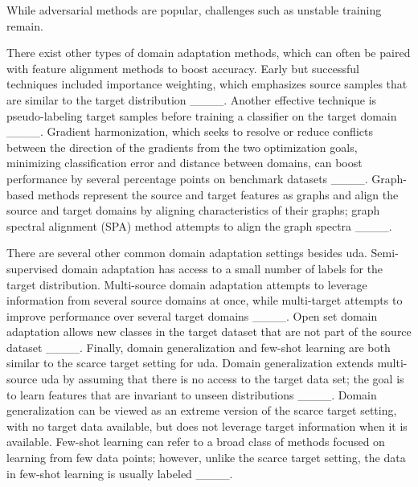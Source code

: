 While adversarial methods are popular, challenges such as unstable training remain.

There exist other types of domain adaptation methods, which can often be paired with feature alignment methods to boost accuracy.
Early but successful techniques included importance weighting, which emphasizes source samples that are similar to the target distribution ____. %
Another effective technique is pseudo-labeling target samples before training a classifier on the target domain ____.
Gradient harmonization, which seeks to resolve or reduce conflicts between the direction of the gradients from the two optimization goals, minimizing classification error and distance between domains, can boost performance by several percentage points on benchmark datasets ____.
Graph-based methods represent the source and target features as graphs and align the source and target domains by aligning characteristics of their graphs; graph spectral alignment (SPA) method attempts to align the graph spectra ____.

There are several other common domain adaptation settings besides \ac{uda}.
Semi-supervised domain adaptation has access to a small number of labels for the target distribution.
Multi-source domain adaptation attempts to leverage information from several source domains at once, while multi-target attempts to improve performance over several target domains ____.
Open set domain adaptation allows new classes in the target dataset that are not part of the source dataset ____.
Finally, domain generalization and few-shot learning are both similar to the scarce target setting for \ac{uda}.
Domain generalization extends multi-source \ac{uda} by assuming that there is no access to the target data set; the goal is to learn features that are invariant to unseen distributions ____.
Domain generalization can be viewed as an extreme version of the scarce target setting, with no target data available, but does not leverage target information when it is available.
Few-shot learning can refer to a broad class of methods focused on learning from few data points; however, unlike the scarce target setting, the data in few-shot learning is usually labeled ____.


